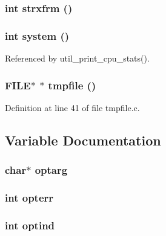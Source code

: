 \subsubsection{\setlength{\rightskip}{0pt plus 5cm}int strxfrm ()}\label{util_8h_7fe8ca5c873ff8cee3918a70f94c1a5d}


\subsubsection{\setlength{\rightskip}{0pt plus 5cm}int system ()}\label{util_8h_6d50e2f4b997abb218cea9a87e543c39}




Referenced by util\_\-print\_\-cpu\_\-stats().
\subsubsection{\setlength{\rightskip}{0pt plus 5cm}FILE$\ast$ $\ast$ tmpfile ()}\label{util_8h_ee98b6ef0ac0da9dfd3fc93daa82a2e5}




Definition at line 41 of file tmpfile.c.

\subsection{Variable Documentation}
\subsubsection{\setlength{\rightskip}{0pt plus 5cm}char$\ast$ \bf{optarg}}\label{util_8h_db50a0eab9fed92fc3bfc7dfa4f2c410}


\subsubsection{\setlength{\rightskip}{0pt plus 5cm}int \bf{opterr}}\label{util_8h_e30f05ee1e2e5652f174a35c7875d25e}


\subsubsection{\setlength{\rightskip}{0pt plus 5cm}int \bf{optind}}\label{util_8h_d5e1c16213bbee2d5e8cc363309f418c}



